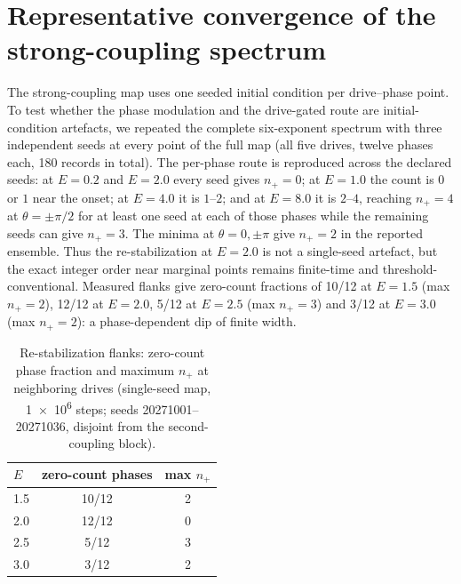 \documentclass[preprint,numbers,a4paper]{elsarticle}
\begin{document}
\section{Representative convergence of the strong-coupling spectrum}
\label{SI-sec:convergence}

The strong-coupling map uses one seeded initial condition per drive--phase point. To test whether the phase modulation and the drive-gated route are initial-condition artefacts, we repeated the complete six-exponent spectrum with three independent seeds at every point of the full map (all five drives, twelve phases each, \num{180} records in total). The per-phase route is reproduced across the declared seeds: at $E=\num{0.2}$ and $E=\num{2.0}$ every seed gives $n_{+}=0$; at $E=\num{1.0}$ the count is $0$ or $1$ near the onset; at $E=\num{4.0}$ it is $1$--$2$; and at $E=\num{8.0}$ it is $2$--$4$, reaching $n_{+}=4$ at $\theta=\pm\pi/2$ for at least one seed at each of those phases while the remaining seeds can give $n_{+}=3$. The minima at $\theta=0,\pm\pi$ give $n_{+}=2$ in the reported ensemble. Thus the re-stabilization at $E=\num{2.0}$ is not a single-seed artefact, but the exact integer order near marginal points remains finite-time and threshold-conventional. Measured flanks give zero-count fractions of \num{10}/\num{12} at $E=\num{1.5}$ (max $n_+=2$), \num{12}/\num{12} at $E=\num{2.0}$, \num{5}/\num{12} at $E=\num{2.5}$ (max $n_+=3$) and \num{3}/\num{12} at $E=\num{3.0}$ (max $n_+=2$): a phase-dependent dip of finite width.

\begin{table}[h]
  \centering
  \caption{Re-stabilization flanks: zero-count phase fraction and maximum $n_{+}$ at neighboring drives (single-seed map, \num{1e6} steps; seeds \num{20271001}--\num{20271036}, disjoint from the second-coupling block).}
  \label{SI-tab:si-window-flanks}
  \begin{tabular}{@{}lcc@{}}
    \toprule
    $E$ & zero-count phases & max $n_{+}$ \\
    \midrule
    \num{1.5} & \num{10}/\num{12} & \num{2} \\
    \num{2.0} & \num{12}/\num{12} & \num{0} \\
    \num{2.5} & \num{5}/\num{12} & \num{3} \\
    \num{3.0} & \num{3}/\num{12} & \num{2} \\
    \bottomrule
  \end{tabular}
\end{table}
\end{document}
